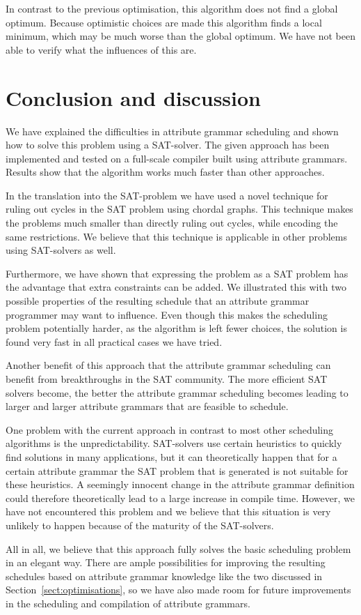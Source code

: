 \documentclass{llncs}
\newcommand{\sectref}[1]{Section~\ref{#1}}
\DeclareRobustCommand{\VAN}[3]{#2}
\begin{document}
In contrast to the previous optimisation, this algorithm does not find a global optimum. Because optimistic choices are made this algorithm finds a local minimum, which may be much worse than the global optimum. We have not been able to verify what the influences of this are.

\section{Conclusion and discussion} \label{sect:conclusion}
We have explained the difficulties in attribute grammar scheduling and shown how to solve this problem using a SAT-solver. The given approach has been implemented and tested on a full-scale compiler built using attribute grammars. Results show that the algorithm works much faster than other approaches.

In the translation into the SAT-problem we have used a novel technique for ruling out cycles in the SAT problem using chordal graphs. This technique makes the problems much smaller than directly ruling out cycles, while encoding the same restrictions. We believe that this technique is applicable in other problems using SAT-solvers as well.

Furthermore, we have shown that expressing the problem as a SAT problem has the advantage that extra constraints can be added. We illustrated this with two possible properties of the resulting schedule that an attribute grammar programmer may want to influence. Even though this makes the scheduling problem potentially harder, as the algorithm is left fewer choices, the solution is found very fast in all practical cases we have tried.

Another benefit of this approach that the attribute grammar scheduling can benefit from breakthroughs in the SAT community. The more efficient SAT solvers become, the better the attribute grammar scheduling becomes leading to larger and larger attribute grammars that are feasible to schedule.

One problem with the current approach in contrast to most other scheduling algorithms is the unpredictability. SAT-solvers use certain heuristics to quickly find solutions in many applications, but it can theoretically happen that for a certain attribute grammar the SAT problem that is generated is not suitable for these heuristics. A seemingly innocent change in the attribute grammar definition could therefore theoretically lead to a large increase in compile time. However, we have not encountered this problem and we believe that this situation is very unlikely to happen because of the maturity of the SAT-solvers.

All in all, we believe that this approach fully solves the basic scheduling problem in an elegant way. There are ample possibilities for improving the resulting schedules based on attribute grammar knowledge like the two discussed in \sectref{sect:optimisations}, so we have also made room for future improvements in the scheduling and compilation of attribute grammars.

\DeclareRobustCommand{\VAN}[3]{#3}


\end{document}
